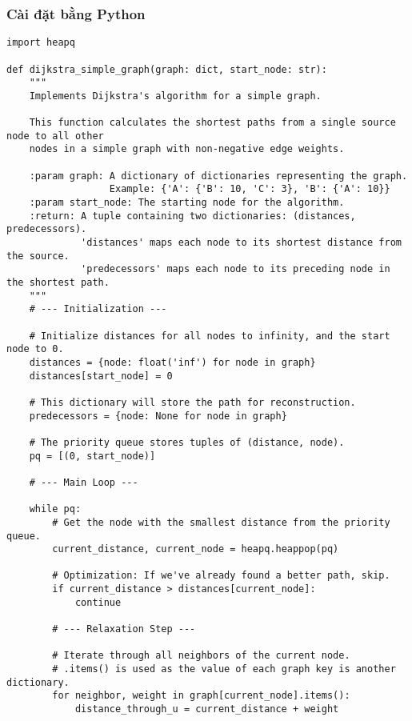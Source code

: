 \documentclass[a4paper,12pt]{article}
\begin{document}
\subsubsection{Cài đặt bằng Python}
\begin{lstlisting}[style=pythonstyle, caption={Cài đặt Dijkstra bằng Python, có truy vết đường đi.}, label={lst:python}]
import heapq

def dijkstra_simple_graph(graph: dict, start_node: str):
    """
    Implements Dijkstra's algorithm for a simple graph.

    This function calculates the shortest paths from a single source node to all other
    nodes in a simple graph with non-negative edge weights.

    :param graph: A dictionary of dictionaries representing the graph.
                  Example: {'A': {'B': 10, 'C': 3}, 'B': {'A': 10}}
    :param start_node: The starting node for the algorithm.
    :return: A tuple containing two dictionaries: (distances, predecessors).
             'distances' maps each node to its shortest distance from the source.
             'predecessors' maps each node to its preceding node in the shortest path.
    """
    # --- Initialization ---
    
    # Initialize distances for all nodes to infinity, and the start node to 0.
    distances = {node: float('inf') for node in graph}
    distances[start_node] = 0
    
    # This dictionary will store the path for reconstruction.
    predecessors = {node: None for node in graph}
    
    # The priority queue stores tuples of (distance, node).
    pq = [(0, start_node)]

    # --- Main Loop ---
    
    while pq:
        # Get the node with the smallest distance from the priority queue.
        current_distance, current_node = heapq.heappop(pq)
        
        # Optimization: If we've already found a better path, skip.
        if current_distance > distances[current_node]:
            continue
            
        # --- Relaxation Step ---
        
        # Iterate through all neighbors of the current node.
        # .items() is used as the value of each graph key is another dictionary.
        for neighbor, weight in graph[current_node].items():
            distance_through_u = current_distance + weight
            

\end{lstlisting}
\end{document}

